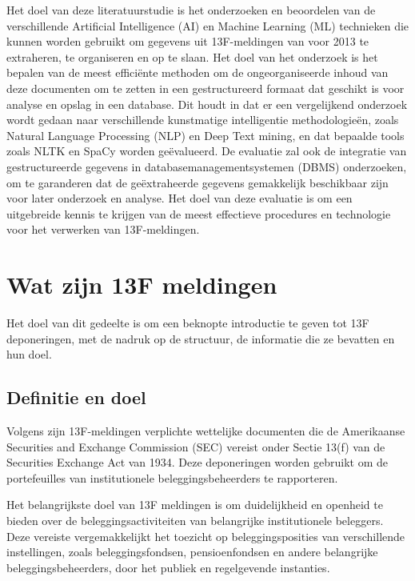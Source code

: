 Het doel van deze literatuurstudie is het onderzoeken en beoordelen van de verschillende Artificial Intelligence (AI) en Machine Learning (ML) technieken die kunnen worden gebruikt om gegevens uit 13F-meldingen van voor 2013 te extraheren, te organiseren en op te slaan. Het doel van het onderzoek is het bepalen van de meest efficiënte methoden om de ongeorganiseerde inhoud van deze documenten om te zetten in een gestructureerd formaat dat geschikt is voor analyse en opslag in een database. Dit houdt in dat er een vergelijkend onderzoek wordt gedaan naar verschillende kunstmatige intelligentie methodologieën, zoals Natural Language Processing (NLP) en Deep Text mining, en dat bepaalde tools zoals NLTK en SpaCy worden geëvalueerd. De evaluatie zal ook de integratie van gestructureerde gegevens in databasemanagementsystemen (DBMS) onderzoeken, om te garanderen dat de geëxtraheerde gegevens gemakkelijk beschikbaar zijn voor later onderzoek en analyse. Het doel van deze evaluatie is om een uitgebreide kennis te krijgen van de meest effectieve procedures en technologie voor het verwerken van 13F-meldingen. 

\section{Wat zijn 13F meldingen}

Het doel van dit gedeelte is om een beknopte introductie te geven tot 13F deponeringen, met de nadruk op de structuur, de informatie die ze bevatten en hun doel.


\subsection{Definitie en doel}
Volgens \autocite{SECform13F2024} zijn 13F-meldingen verplichte wettelijke documenten die de Amerikaanse Securities and Exchange Commission (SEC) vereist onder Sectie 13(f) van de Securities Exchange Act van 1934. Deze deponeringen worden gebruikt om de portefeuilles van institutionele beleggingsbeheerders te rapporteren.

Het belangrijkste doel van 13F meldingen is om duidelijkheid en openheid te bieden over de beleggingsactiviteiten van belangrijke institutionele beleggers. Deze vereiste vergemakkelijkt het toezicht op beleggingsposities van verschillende instellingen, zoals beleggingsfondsen, pensioenfondsen en andere belangrijke beleggingsbeheerders, door het publiek en regelgevende instanties.

